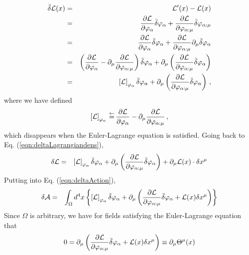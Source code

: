 \begin{eqnarray*}
\bar{\delta} {\cal L} (x)
&=&
{\cal L}' (x) - {\cal L}(x)  
\nonumber\\
&=&
\frac{\partial {\cal L}}{\partial \varphi_\alpha} \bar{\delta} \varphi_\alpha
+
\frac{\partial {\cal L}}{\partial \varphi_{\alpha : \mu}} \bar{\delta} \varphi_{\alpha : \mu}
\nonumber\\
&=&
\frac{\partial {\cal L}}{\partial \varphi_\alpha} \bar{\delta} \varphi_\alpha
+
\frac{\partial {\cal L}}{\partial \varphi_{\alpha : \mu}} \partial_\mu \bar{\delta} \varphi_{\alpha}
\nonumber\\
&=&
\left(
\frac{\partial {\cal L}}{\partial \varphi_\alpha} 
- 
\partial_\mu \frac{\partial {\cal L}}{\partial \varphi_{\alpha : \mu}} 
\right)
\bar{\delta} \varphi_\alpha
+
\partial_\mu \left(
\frac{\partial {\cal L}}{\partial \varphi_{\alpha : \mu}}  \bar{\delta} \varphi_{\alpha}
\right)
\\
&=&
\left[ {\cal L} \right]_{\varphi_\alpha}
\bar{\delta} \varphi_\alpha
+
\partial_\mu \left(
\frac{\partial {\cal L}}{\partial \varphi_{\alpha : \mu}}  \bar{\delta} \varphi_{\alpha}
\right) \,,
\end{eqnarray*}
where we have defined
\begin{equation*}
\left[ {\cal L} \right]_{\varphi_\alpha}
\,\mbox{$\stackrel{\leftarrow}{=}$}\,
\frac{\partial {\cal L}}{\partial \varphi_\alpha} 
- 
\partial_\mu \frac{\partial {\cal L}}{\partial \varphi_{\alpha : \mu}} 
\,,
\end{equation*}
which disappears when the Euler-Lagrange equation is satisfied.
Going back to Eq. (\ref{eqn:deltaLagrangiandens}),
\begin{eqnarray*}
\delta {\cal L}
&=&
\left[ {\cal L} \right]_{\varphi_\alpha}
\bar{\delta} \varphi_\alpha
+
\partial_\mu \left(
\frac{\partial {\cal L}}{\partial \varphi_{\alpha : \mu}}  \bar{\delta} \varphi_{\alpha}
\right)
+
 \partial_\mu {\cal L}(x)\cdot \delta x^\mu
\end{eqnarray*}
Putting into Eq. (\ref{eqn:deltaAction}),
\begin{eqnarray}
\delta {\cal A}
&=&
\int_{\Omega} 
d^4 x
\left\{
\left[ {\cal L} \right]_{\varphi_\alpha}
\bar{\delta} \varphi_\alpha
+
\partial_\mu \left(
\frac{\partial {\cal L}}{\partial \varphi_{\alpha : \mu}}  \bar{\delta} \varphi_{\alpha}
+
{\cal L}(x) \delta x^\mu
\right)
\right\}
\label{eqn:deltaAintermed}
\end{eqnarray}
Since $\Omega$ is arbitrary, we have
for fields satisfying the Euler-Lagrange equation that
\begin{equation}
0
=
\partial_\mu \left(
\frac{\partial {\cal L}}{\partial \varphi_{\alpha : \mu}}  \bar{\delta} \varphi_{\alpha}
+
{\cal L}(x) \delta x^\mu
\right)
\equiv
\partial_\mu
\Theta^\mu(x)
\end{equation}
